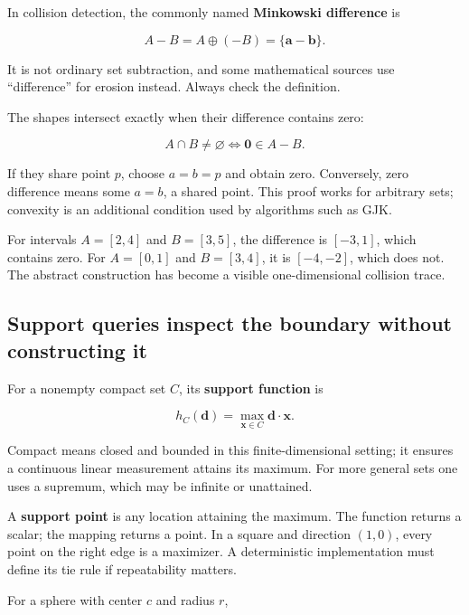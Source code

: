 \hypertarget{01-foundations-i-ch018-collision-becomes-a-question-about-the-origin}{}

In collision detection, the commonly named \textbf{Minkowski difference} is

\[
A-B=A\oplus(-B)=\{\mathbf a-\mathbf b\}.
\]

It is not ordinary set subtraction, and some mathematical sources use ``difference'' for erosion instead. Always check the definition.

The shapes intersect exactly when their difference contains zero:

\[
A\cap B\ne\varnothing\iff\mathbf0\in A-B.
\]

If they share point \(p\), choose \(a=b=p\) and obtain zero. Conversely, zero difference means some \(a=b\), a shared point. This proof works for arbitrary sets; convexity is an additional condition used by algorithms such as GJK.

For intervals \(A=[2,4]\) and \(B=[3,5]\), the difference is \([-3,1]\), which contains zero. For \(A=[0,1]\) and \(B=[3,4]\), it is \([-4,-2]\), which does not. The abstract construction has become a visible one-dimensional collision trace.

\subsection{Support queries inspect the boundary without constructing it}\label{01-foundations-i-ch018-support-queries-inspect-the-boundary-without-constructing-it}

\hypertarget{01-foundations-i-ch018-support-queries-inspect-the-boundary-without-constructing-it}{}

For a nonempty compact set \(C\), its \textbf{support function} is

\[
h_C(\mathbf d)=\max_{\mathbf x\in C}\mathbf d\cdot\mathbf x.
\]

Compact means closed and bounded in this finite-dimensional setting; it ensures a continuous linear measurement attains its maximum. For more general sets one uses a supremum, which may be infinite or unattained.

A \textbf{support point} is any location attaining the maximum. The function returns a scalar; the mapping returns a point. In a square and direction \((1,0)\), every point on the right edge is a maximizer. A deterministic implementation must define its tie rule if repeatability matters.

For a sphere with center \(c\) and radius \(r\),

